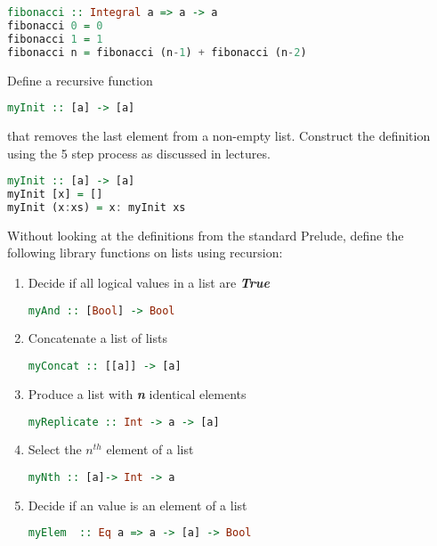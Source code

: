 \documentclass{article}
\begin{document}
\begin{Answer}
\begin{lstlisting}[language=Haskell]
fibonacci :: Integral a => a -> a 
fibonacci 0 = 0
fibonacci 1 = 1
fibonacci n = fibonacci (n-1) + fibonacci (n-2) 
\end{lstlisting}
\end{Answer}
\begin{Exercise}[difficulty = 2]
Define a recursive function \\
\begin{lstlisting}[language=Haskell]
myInit :: [a] -> [a]
\end{lstlisting}
that removes the last element from a non-empty list. Construct the definition using the 5 step process as discussed in lectures.

\end{Exercise}
\begin{Answer}
\begin{lstlisting}[language=Haskell]
myInit :: [a] -> [a]
myInit [x] = []
myInit (x:xs) = x: myInit xs
\end{lstlisting}
\end{Answer}
\pagebreak
\begin{Exercise}[difficulty = 2]
Without looking at the definitions from the standard Prelude, define the following library functions on lists using recursion: 
\begin{enumerate}
	\item Decide if all logical values in a list are \textbf{\textit{True}}
	\begin{lstlisting}[language=Haskell]
myAnd :: [Bool] -> Bool
	\end{lstlisting}
	\item Concatenate a list of lists
\begin{lstlisting}[language=Haskell]
myConcat :: [[a]] -> [a]
\end{lstlisting}
	\item Produce a list with \textbf{\textit{n}} identical elements
\begin{lstlisting}[language=Haskell]
myReplicate :: Int -> a -> [a]
\end{lstlisting}
	\item Select the $n^{th}$ element of a list
\begin{lstlisting}[language=Haskell]
myNth :: [a]-> Int -> a
\end{lstlisting}
	\item Decide if an value is an element of a list
\begin{lstlisting}[language=Haskell]
myElem  :: Eq a => a -> [a] -> Bool
\end{lstlisting}
 \end{enumerate}
\end{Exercise}
\end{document}
